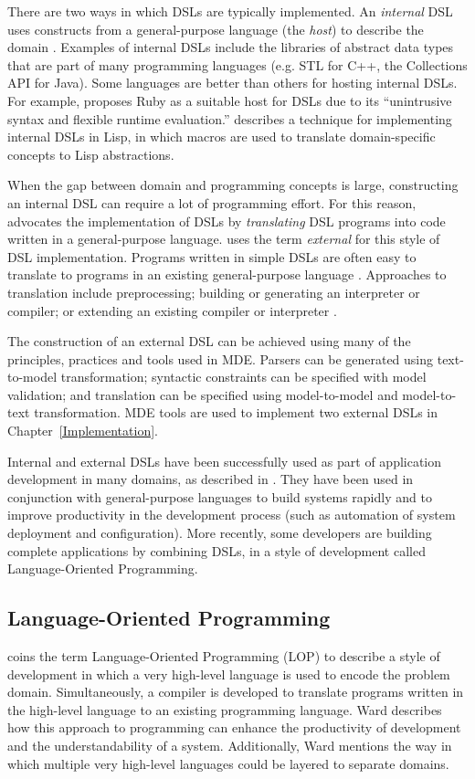 There are two ways in which DSLs are typically implemented. An \emph{internal} DSL uses constructs from a general-purpose language (the \emph{host}) to describe the domain \cite{fowler10dsls}. Examples of internal DSLs include the libraries of abstract data types that are part of many programming languages (e.g. STL for C++, the Collections API for Java). Some languages are better than others for hosting internal DSLs. For example, \cite{fowler10dsls} proposes Ruby as a suitable host for DSLs due to its ``unintrusive syntax and flexible runtime evaluation.'' \cite{graham93lisp} describes a technique for implementing internal DSLs in Lisp, in which macros are used to translate domain-specific concepts to Lisp abstractions.

When the gap between domain and programming concepts is large, constructing an internal DSL can require a lot of programming effort. For this reason, \cite{parr07antlr} advocates the implementation of DSLs by \emph{translating} DSL programs into code written in a general-purpose language. \cite{fowler10dsls} uses the term \emph{external} for this style of DSL implementation. Programs written in simple DSLs are often easy to translate to programs in an existing general-purpose language \cite{parr07antlr}. Approaches to translation include preprocessing; building or generating an interpreter or compiler; or extending an existing compiler or interpreter \cite{fowler10dsls}.

The construction of an external DSL can be achieved using many of the principles, practices and tools used in MDE. Parsers can be generated using text-to-model transformation; syntactic constraints can be specified with model validation; and translation can be specified using model-to-model and model-to-text transformation. MDE tools are used to implement two external DSLs in Chapter~\ref{Implementation}.

Internal and external DSLs have been successfully used as part of application development in many domains, as described in \cite{deursen00dslbib}. They have been used in conjunction with general-purpose languages to build systems rapidly and to improve productivity in the development process (such as automation of system deployment and configuration). More recently, some developers are building complete applications by combining DSLs, in a style of development called Language-Oriented Programming. 

\subsection{Language-Oriented Programming}
\cite{ward94lop} coins the term Language-Oriented Programming (LOP) to describe a style of development in which a very high-level language is used to encode the problem domain. Simultaneously, a compiler is developed to translate programs written in the high-level language to an existing programming language. Ward describes how this approach to programming can enhance the productivity of development and the understandability of a system. Additionally, Ward mentions the way in which multiple very high-level languages could be layered to separate domains.

